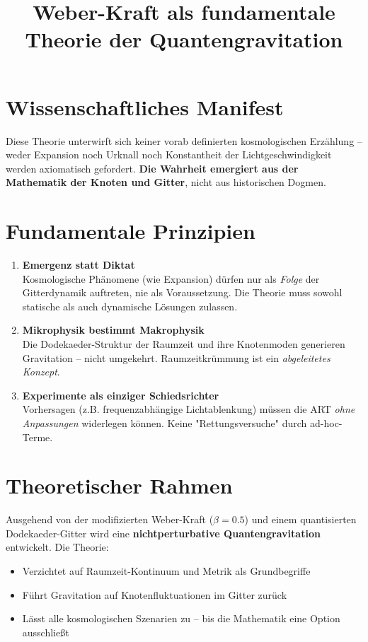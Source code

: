 \documentclass{article}
\title{Weber-Kraft als fundamentale Theorie der Quantengravitation}
\author{}
\date{}
\begin{document}
\maketitle

\section*{Wissenschaftliches Manifest}
Diese Theorie unterwirft sich keiner vorab definierten kosmologischen Erzählung – weder Expansion noch Urknall noch Konstantheit der Lichtgeschwindigkeit werden axiomatisch gefordert. \textbf{Die Wahrheit emergiert aus der Mathematik der Knoten und Gitter}, nicht aus historischen Dogmen.

\section*{Fundamentale Prinzipien}
\begin{enumerate}
    \item \textbf{Emergenz statt Diktat} \\
    Kosmologische Phänomene (wie Expansion) dürfen nur als \emph{Folge} der Gitterdynamik auftreten, nie als Voraussetzung. Die Theorie muss sowohl statische als auch dynamische Lösungen zulassen.
    
    \item \textbf{Mikrophysik bestimmt Makrophysik} \\
    Die Dodekaeder-Struktur der Raumzeit und ihre Knotenmoden generieren Gravitation – nicht umgekehrt. Raumzeitkrümmung ist ein \emph{abgeleitetes Konzept}.
    
    \item \textbf{Experimente als einziger Schiedsrichter} \\
    Vorhersagen (z.B. frequenzabhängige Lichtablenkung) müssen die ART \emph{ohne Anpassungen} widerlegen können. Keine "Rettungsversuche" durch ad-hoc-Terme.
\end{enumerate}

\section*{Theoretischer Rahmen}
Ausgehend von der modifizierten Weber-Kraft ($\beta=0.5$) und einem quantisierten Dodekaeder-Gitter wird eine \textbf{nichtperturbative Quantengravitation} entwickelt. Die Theorie:

\begin{itemize}
    \item Verzichtet auf Raumzeit-Kontinuum und Metrik als Grundbegriffe
    \item Führt Gravitation auf Knotenfluktuationen im Gitter zurück
    \item Lässt alle kosmologischen Szenarien zu – bis die Mathematik eine Option ausschließt
\end{itemize}
\end{document}

